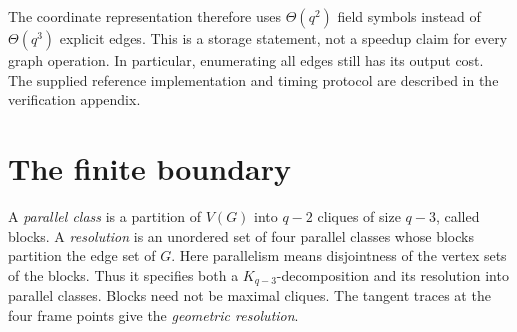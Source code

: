 \documentclass[11pt]{article}
\theoremstyle{definition}
\theoremstyle{remark}
\begin{document}
The coordinate representation therefore uses $\Theta(q^2)$ field symbols
instead of $\Theta(q^3)$ explicit edges. This is a storage statement,
not a speedup claim for every graph operation. In particular, enumerating
all edges still has its output cost. The supplied reference implementation
and timing protocol are described in the verification appendix.

\section{The finite boundary}\label{sec:boundary}

A \emph{parallel class} is a partition of $V(G)$ into $q-2$ cliques
of size $q-3$, called blocks. A \emph{resolution} is an unordered set of
four parallel classes whose blocks partition the edge set of $G$.
Here parallelism means disjointness of the vertex sets of the blocks.
Thus it specifies both a $K_{q-3}$-decomposition and its resolution into
parallel classes. Blocks need not be maximal cliques. The tangent traces
at the four frame points give the \emph{geometric resolution}.
\end{document}
